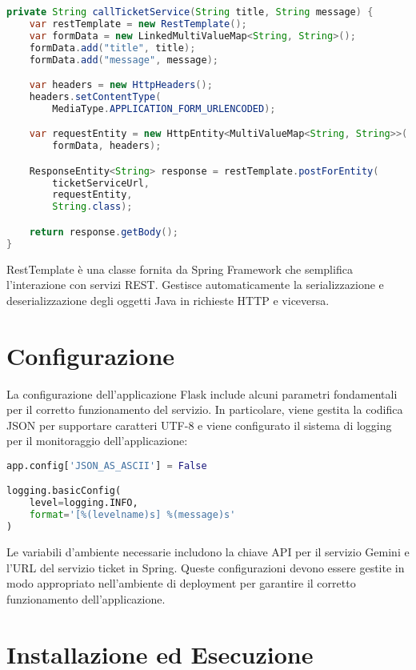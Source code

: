 \begin{lstlisting}[language=Java, caption=Codice Integrazione Spring]
private String callTicketService(String title, String message) {
    var restTemplate = new RestTemplate();
    var formData = new LinkedMultiValueMap<String, String>();
    formData.add("title", title);
    formData.add("message", message);

    var headers = new HttpHeaders();
    headers.setContentType(
        MediaType.APPLICATION_FORM_URLENCODED);

    var requestEntity = new HttpEntity<MultiValueMap<String, String>>(
        formData, headers);

    ResponseEntity<String> response = restTemplate.postForEntity(
        ticketServiceUrl,
        requestEntity,
        String.class);

    return response.getBody();
}
\end{lstlisting}

\begin{definition}[RestTemplate]
RestTemplate è una classe fornita da Spring Framework che semplifica l'interazione con servizi REST. Gestisce automaticamente la serializzazione e deserializzazione degli oggetti Java in richieste HTTP e viceversa.
\end{definition}

\section{Configurazione}
La configurazione dell'applicazione Flask include alcuni parametri fondamentali per il corretto funzionamento del servizio. In particolare, viene gestita la codifica JSON per supportare caratteri UTF-8 e viene configurato il sistema di logging per il monitoraggio dell'applicazione:

\begin{lstlisting}[language=Python, caption=Configurazione base]
app.config['JSON_AS_ASCII'] = False

logging.basicConfig(
    level=logging.INFO,
    format='[%(levelname)s] %(message)s'
)
\end{lstlisting}

Le variabili d'ambiente necessarie includono la chiave API per il servizio Gemini e l'URL del servizio ticket in Spring. Queste configurazioni devono essere gestite in modo appropriato nell'ambiente di deployment per garantire il corretto funzionamento dell'applicazione.

\section{Installazione ed Esecuzione}

